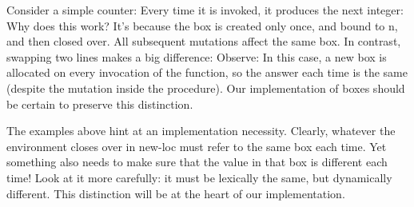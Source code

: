 
Consider a simple counter:
Every time it is invoked, it produces the next integer:
Why does this work? It’s because the box is created only once, and bound to n,
and then closed over. All subsequent mutations affect the same box. In contrast,
swapping two lines makes a big difference:
Observe:
In this case, a new box is allocated on every invocation of the function, so the
answer each time is the same (despite the mutation inside the procedure). Our
implementation of boxes should be certain to preserve this distinction.

The examples above hint at an implementation necessity. Clearly, whatever the
environment closes over in new-loc must refer to the same box each time. Yet
something also needs to make sure that the value in that box is different each
time! Look at it more carefully: it must be lexically the same, but dynamically
different. This distinction will be at the heart of our implementation.
